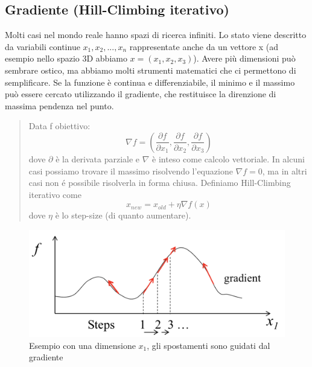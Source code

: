 \documentclass{article}
\begin{document}
\subsection{Gradiente (Hill-Climbing iterativo)}
Molti casi nel mondo reale hanno spazi di ricerca infiniti. Lo stato viene descritto da variabili continue $x_1, x_2, ..., x_n$ rappresentate anche da un vettore x (ad esempio nello spazio 3D abbiamo $x=(x_1,x_2,x_3)$). Avere più dimensioni può sembrare ostico, ma abbiamo molti strumenti matematici che ci permettono di semplificare. \newline
Se la funzione è continua e differenziabile, il minimo e il massimo può essere cercato utilizzando il gradiente, che restituisce la direnzione di massima pendenza nel punto.
\begin{quote}
    Data f obiettivo:
    \[
    \nabla f = (\frac{\partial f}{\partial x_1}, \frac{\partial f}{\partial x_2}, \frac{\partial f}{\partial x_3})
    \] \newline dove $\partial$ è la derivata parziale e $\nabla$ è inteso come calcolo vettoriale. In alcuni casi possiamo trovare il massimo risolvendo l'equazione $\nabla f=0$, ma in altri casi non é possibile risolverla in forma chiusa.\newline
    Definiamo Hill-Climbing iterativo come
    \[
        x_{new} = x_{old} + \eta \nabla f(x)
    \]
    dove $\eta$ è lo step-size (di quanto aumentare).
\end{quote}
\begin{figure}[H]
    \centering
    \includegraphics[scale=0.5]{Images/gradient.png}
    \caption{Esempio con una dimensione $x_1$, gli spostamenti sono guidati dal gradiente}
\end{figure}

\clearpage
\end{document}
